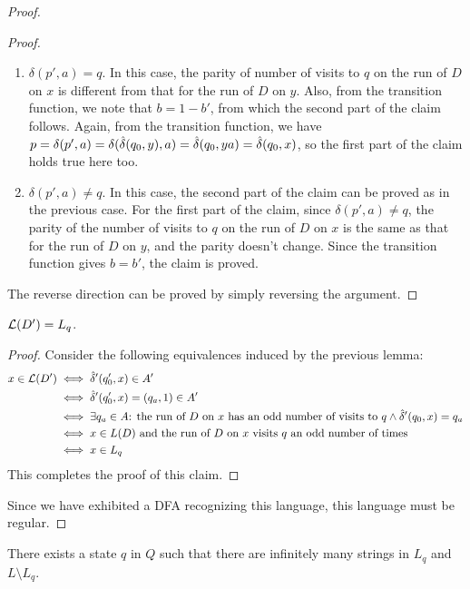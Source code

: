 \begin{soln}
\begin{proof}
\begin{proof}
        \begin{enumerate}
            \item $\delta(p', a) = q$.\nl
                In this case, the parity of number of visits to $q$ on the run of $D$ on $x$ is different from that for the run of $D$ on $y$. Also, from the transition function, we note that $b = 1 -
                b'$, from which the second part of the claim follows. Again, from the transition function, we have $p = \delta(p', a) = \delta(\hat{\delta}(q_0, y), a) = \hat{\delta}(q_0, ya) = \hat{\delta}(q_0,
                x)$, so the first part of the claim holds true here too.
            \item $\delta(p', a) \ne q$.\nl
                In this case, the second part of the claim can be proved as in the previous case. For the first part of the claim, since $\delta(p', a) \ne q$, the parity of the number of visits to $q$ on
                the run of $D$ on $x$ is the same as that for the run of $D$ on $y$, and the parity doesn't change. Since the transition function gives $b = b'$, the claim is proved.
        \end{enumerate}
        The reverse direction can be proved by simply reversing the argument.
    \end{proof}
    \begin{claim}
        $\mathcal{L}(D') = L_q$.
    \end{claim}
    \begin{proof}
        Consider the following equivalences induced by the previous lemma:
        \begin{align*}
            x \in \mathcal{L}(D') &\iff \hat{\delta}'(q_0', x) \in A'\\
                        &\iff \hat{\delta}'(q_0', x) = (q_a, 1) \in A'\\
                        &\iff \exists q_a \in A \text{: the run of }D\text{ on }x\text{ has an odd number of visits to }q \land \hat{\delta}'(q_0, x) = q_a\\
                        &\iff x \in L(D) \text{ and the run of }D\text{ on }x\text{ visits }q\text{ an odd number of times}\\
                        &\iff x \in L_q
        \end{align*}
        This completes the proof of this claim.
    \end{proof}
    Since we have exhibited a DFA recognizing this language, this language must be regular.
    \end{proof}
    \begin{claim}
        There exists a state $q$ in $Q$ such that there are infinitely many strings in $L_q$ and $L \setminus L_q$.

\end{claim}
\end{soln}
